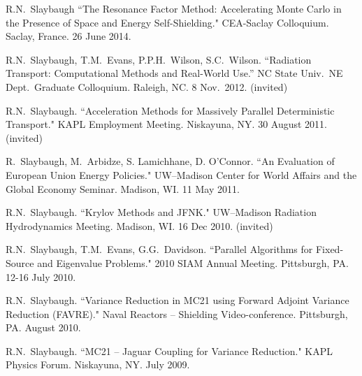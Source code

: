 \begin{bibsection}
\item R.N.\ Slaybaugh ``The Resonance Factor Method: Accelerating Monte Carlo in the Presence of Space and Energy Self-Shielding." CEA-Saclay Colloquium. Saclay, France. 26 June 2014.

\item R.N.\ Slaybaugh, T.M.\ Evans, P.P.H.\ Wilson, S.C.\ Wilson. ``Radiation Transport: Computational Methods and Real-World Use.'' NC State Univ.\ NE Dept.\ Graduate Colloquium. Raleigh, NC. 8 Nov.\ 2012. (invited)

\item R.N.\ Slaybaugh. ``Acceleration Methods for Massively Parallel Deterministic Transport." KAPL Employment Meeting. Niskayuna, NY. 30 August 2011. (invited)

\item R.\ Slaybaugh, M.\ Arbidze, S. Lamichhane, D. O'Connor. ``An Evaluation of European Union Energy Policies." UW--Madison Center for World Affairs and the Global Economy Seminar. Madison, WI. 11 May 2011.

\item R.N.\ Slaybaugh. ``Krylov Methods and JFNK." UW--Madison Radiation Hydrodynamics Meeting. Madison, WI. 16 Dec 2010. (invited)

\item R.N.\ Slaybaugh, T.M.\ Evans, G.G.\ Davidson. ``Parallel Algorithms for Fixed-Source and Eigenvalue Problems." 2010 SIAM Annual Meeting. Pittsburgh, PA. 12-16 July 2010.

\item R.N.\ Slaybaugh. ``Variance Reduction in MC21 using Forward Adjoint Variance Reduction (FAVRE)." Naval Reactors – Shielding Video-conference. Pittsburgh, PA. August 2010.

\item R.N.\ Slaybaugh. ``MC21 – Jaguar Coupling for Variance Reduction." KAPL Physics Forum. Niskayuna, NY. July 2009.

\end{bibsection}


